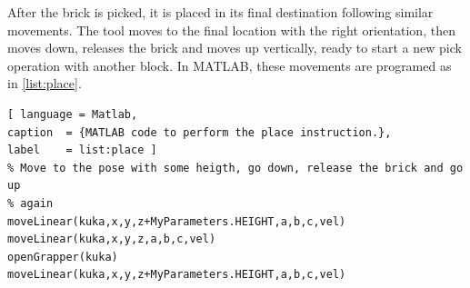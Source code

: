 After the brick is picked, it is placed in its final destination following similar movements. The tool moves to the final location with the right orientation, then moves down, releases the brick and moves up vertically, ready to start a new pick operation with another block. In MATLAB, these movements are programed as in \autoref{list:place}.
%
\begin{lstlisting}[ language = Matlab,
caption  = {MATLAB code to perform the place instruction.},
label    = list:place ]
% Move to the pose with some heigth, go down, release the brick and go up
% again
moveLinear(kuka,x,y,z+MyParameters.HEIGHT,a,b,c,vel)
moveLinear(kuka,x,y,z,a,b,c,vel)
openGrapper(kuka)
moveLinear(kuka,x,y,z+MyParameters.HEIGHT,a,b,c,vel)
\end{lstlisting}